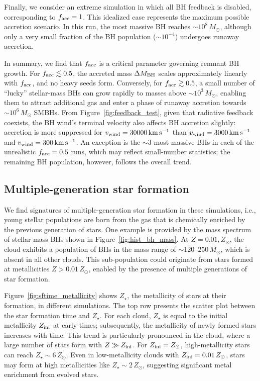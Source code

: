 \documentclass[twocolumn]{aastex631}
\begin{document}
Finally, we consider an extreme simulation in which all BH feedback is disabled, corresponding to $f_{\rm acc}=1$. This idealized case represents the maximum possible accretion scenario. In this run, the most massive BH reaches $\sim 10^8\,M_\odot$, although only a very small fraction of the BH population ($\sim 10^{-4}$) undergoes runaway accretion.

In summary, we find that $f_{\rm acc}$ is a critical parameter governing remnant BH growth. For $f_{\rm acc}\lesssim 0.5$, the accreted mass $\Delta M_{\rm BH}$ scales approximately linearly with $f_{\rm acc}$, and no heavy seeds form. Conversely, for $f_{\rm acc}\gtrsim 0.5$, a small number of ``lucky'' stellar-mass BHs can grow rapidly to masses above $\sim 10^3\,M_\odot$, enabling them to attract additional gas and enter a phase of runaway accretion towards $\sim 10^6\,M_\odot$ SMBHs. From Figure~\ref{fig:feedback_test}, given that radiative feedback coexists, the BH wind's terminal velocity also affects BH accretion slightly: accretion is more suppressed for $v_{\rm wind}=30000\,\rm km\,s^{-1}$ than $v_{\rm wind}=3000\,\rm km\,s^{-1}$ and $v_{\rm wind}=300\,\rm km\,s^{-1}$. An exception is the $\sim 3$ most massive BHs in each of the unrealistic $f_{\rm acc}=0.5$ runs, which may reflect small-number statistics; the remaining BH population, however, follows the overall trend.








\subsection{Multiple-generation star formation}

We find signatures of multiple-generation star formation in these simulations, i.e., young stellar populations are born from the gas that is chemically enriched by the previous generation of stars. One example is provided by the mass spectrum of stellar-mass BHs shown in Figure~\ref{fig:hist_bh_mass}. At $Z=0.01,Z_\odot$, the  cloud exhibits a population of BHs in the mass range of $\sim 120$--$250\,M_\odot$, which is absent in all other clouds. This sub-population could originate from stars formed at metallicities $Z>0.01\,Z_\odot$, enabled by the presence of multiple generations of star formation.

Figure~\ref{fig:sftime_metallicity} shows $Z_\star$, the metallicity of stars at their formation, in different simulations. The top row presents the scatter plot between the star formation time and $Z_\star$. For each cloud, $Z_\star$ is equal to the initial metallicity $Z_{\rm ini}$ at early times; subsequently, the metallicity of newly formed stars increases with time. This trend is particularly pronounced in the  cloud, where a large number of stars form with $Z \gg Z_{\rm ini}$. For $Z_{\rm ini}=Z_\odot$, high-metallicity stars can reach $Z_\star \sim 6\,Z_\odot$. Even in low-metallicity clouds with $Z_{\rm ini}=0.01\,Z_\odot$, stars may form at high metallicities like $Z_\star \sim 2\, Z_\odot$, suggesting significant metal enrichment from evolved stars.
\end{document}
